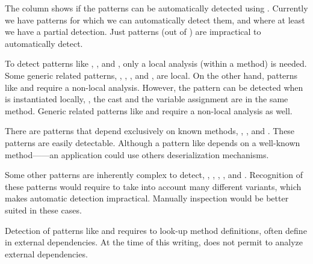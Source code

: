 The \gh{\ql{}} column shows if the patterns can be automatically detected using \ql{}.
Currently we have \nCmarkCount{} patterns for which we can automatically detect them, and
\nExisCount{} where at least we have a partial detection.
Just \nXmarkCount{} patterns (out of \nPattern{}) are impractical to automatically detect.

To detect patterns like
,
, and
,
only a local analysis (within a method) is needed.
Some generic related patterns, \eg{},
,
, and
,
are local.
On the other hand,
patterns like  and
 require a non-local analysis.
However, the  pattern can be detected when
is instantiated locally, \ie{},
the cast and the variable assignment are in the same method.
Generic related patterns like  and  require a non-local analysis as well.

There are patterns that depend exclusively on known methods, \eg{},
, and
.
These patterns are easily detectable.
Although a pattern like  depends on a well-known method------an application could use others deserialization mechanisms.

Some other patterns are inherently complex to detect, \eg{},
,
,
, and
.
Recognition of these patterns would require to take into account many different variants,
which makes automatic detection impractical.
Manually inspection would be better suited in these cases. 

Detection of patterns like  and  requires to look-up method definitions,
often define in external dependencies.
At the time of this writing, \ql{} does not permit to analyze external dependencies.
